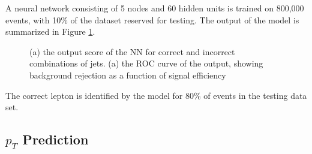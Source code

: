 

A neural network consisting of 5 nodes and 60 hidden units is trained on 800,000 events, with 10\% of the dataset reserved for testing. The output of the model is summarized in Figure \ref{fig:higgs3lFresults}.

\begin{figure}[H]
  \centering
  \label{fig:higgs3lFresults}
  \caption{(a) the output score of the NN for correct and incorrect combinations of jets. (a) the ROC curve of the output, showing background rejection as a function of signal efficiency}
\end{figure} 

The correct lepton is identified by the model for 80\% of events in the testing data set.


\subsection{$p_T$ Prediction}
\label{sec:ptReco}

